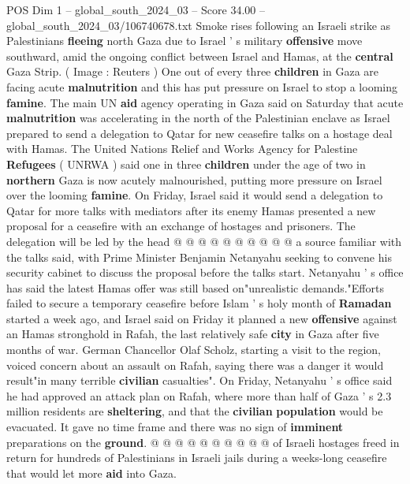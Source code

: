 \begin{textsample}{POS Dim 1 – global\_south\_2024\_03 – Score 34.00 – global\_south\_2024\_03/106740678.txt}  \label{ex:f1_pos_010}
Smoke rises following an Israeli strike as Palestinians \textbf{fleeing} north Gaza due to Israel ' s military \textbf{offensive} move southward, amid the ongoing conflict between Israel and Hamas, at the \textbf{central} Gaza Strip. ( Image : Reuters ) One out of every three \textbf{children} in Gaza are facing acute \textbf{malnutrition} and this has put pressure on Israel to stop a looming \textbf{famine}.
The main UN \textbf{aid} agency operating in Gaza said on Saturday that acute \textbf{malnutrition} was accelerating in the north of the Palestinian enclave as Israel prepared to send a delegation to Qatar for new ceasefire talks on a hostage deal with Hamas.
The United Nations Relief and Works Agency for Palestine \textbf{Refugees} ( UNRWA ) said one in three \textbf{children} under the age of two in \textbf{northern} Gaza is now acutely malnourished, putting more pressure on Israel over the looming \textbf{famine}.
On Friday, Israel said it would send a delegation to Qatar for more talks with mediators after its enemy Hamas presented a new proposal for a ceasefire with an exchange of hostages and prisoners.
The delegation will be led by the head @ @ @ @ @ @ @ @ @ @ a source familiar with the talks said, with Prime Minister Benjamin Netanyahu seeking to convene his security cabinet to discuss the proposal before the talks start.
Netanyahu ' s office has said the latest Hamas offer was still based on"unrealistic demands."Efforts failed to secure a temporary ceasefire before Islam ' s holy month of \textbf{Ramadan} started a week ago, and Israel said on Friday it planned a new \textbf{offensive} against an Hamas stronghold in Rafah, the last relatively safe \textbf{city} in Gaza after five months of war.
German Chancellor Olaf Scholz, starting a visit to the region, voiced concern about an assault on Rafah, saying there was a danger it would result"in many terrible \textbf{civilian} casualties".
On Friday, Netanyahu ' s office said he had approved an attack plan on Rafah, where more than half of Gaza ' s 2.3 million residents are \textbf{sheltering}, and that the \textbf{civilian} \textbf{population} would be evacuated.
It gave no time frame and there was no sign of \textbf{imminent} preparations on the \textbf{ground}. @ @ @ @ @ @ @ @ @ @ of Israeli hostages freed in return for hundreds of Palestinians in Israeli jails during a weeks-long ceasefire that would let more \textbf{aid} into Gaza.

\end{textsample}
